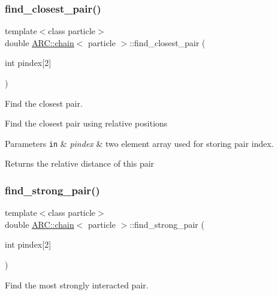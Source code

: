 \subsubsection{\texorpdfstring{find\+\_\+closest\+\_\+pair()}{find\_closest\_pair()}}
{\footnotesize\ttfamily template$<$class particle$>$ \\
double \hyperlink{classARC_1_1chain}{A\+R\+C\+::chain}$<$ particle $>$\+::find\+\_\+closest\+\_\+pair (\begin{DoxyParamCaption}\item[{int}]{pindex\mbox{[}2\mbox{]} }\end{DoxyParamCaption})\hspace{0.3cm}{\ttfamily [inline]}}



Find the closest pair. 

Find the closest pair using relative positions 
\begin{DoxyParams}[1]{Parameters}
\mbox{\tt in}  & {\em pindex} & two element array used for storing pair index. \\
\hline
\end{DoxyParams}
\begin{DoxyReturn}{Returns}
the relative distance of this pair 
\end{DoxyReturn}
\hypertarget{classARC_1_1chain_aacb06e4f2129d5f887f1a62553aa24dc}{}\label{classARC_1_1chain_aacb06e4f2129d5f887f1a62553aa24dc} 
\subsubsection{\texorpdfstring{find\+\_\+strong\+\_\+pair()}{find\_strong\_pair()}}
{\footnotesize\ttfamily template$<$class particle$>$ \\
double \hyperlink{classARC_1_1chain}{A\+R\+C\+::chain}$<$ particle $>$\+::find\+\_\+strong\+\_\+pair (\begin{DoxyParamCaption}\item[{int}]{pindex\mbox{[}2\mbox{]} }\end{DoxyParamCaption})\hspace{0.3cm}{\ttfamily [inline]}}



Find the most strongly interacted pair. 

